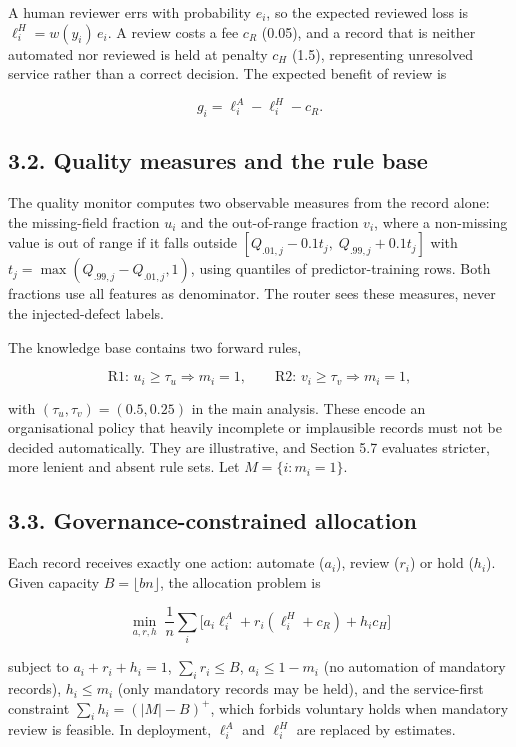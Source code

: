 \documentclass[
  11pt,
]{article}
\begin{document}
A human reviewer errs with probability \(e_i\), so the expected reviewed
loss is \(\ell^H_i = w(y_i)\,e_i\). A review costs a fee \(c_R\) (0.05),
and a record that is neither automated nor reviewed is held at penalty
\(c_H\) (1.5), representing unresolved service rather than a correct
decision. The expected benefit of review is

\[g_i = \ell^A_i - \ell^H_i - c_R. \tag{2}\]

\hypertarget{quality-measures-and-the-rule-base}{%
\subsection{3.2. Quality measures and the rule
base}\label{quality-measures-and-the-rule-base}}

The quality monitor computes two observable measures from the record
alone: the missing-field fraction \(u_i\) and the out-of-range fraction
\(v_i\), where a non-missing value is out of range if it falls outside
\([Q_{.01,j}-0.1t_j,\;Q_{.99,j}+0.1t_j]\) with
\(t_j=\max(Q_{.99,j}-Q_{.01,j},1)\), using quantiles of
predictor-training rows. Both fractions use all features as denominator.
The router sees these measures, never the injected-defect labels.

The knowledge base contains two forward rules,

\[\text{R1: } u_i \ge \tau_u \Rightarrow m_i = 1, \qquad \text{R2: } v_i \ge \tau_v \Rightarrow m_i = 1, \tag{3}\]

with \((\tau_u,\tau_v)=(0.5,0.25)\) in the main analysis. These encode
an organisational policy that heavily incomplete or implausible records
must not be decided automatically. They are illustrative, and Section
5.7 evaluates stricter, more lenient and absent rule sets. Let
\(M=\{i: m_i=1\}\).

\hypertarget{governance-constrained-allocation}{%
\subsection{3.3. Governance-constrained
allocation}\label{governance-constrained-allocation}}

Each record receives exactly one action: automate (\(a_i\)), review
(\(r_i\)) or hold (\(h_i\)). Given capacity \(B=\lfloor bn \rfloor\),
the allocation problem is

\[\min_{a,r,h}\; \frac1n\sum_i \big[a_i\ell^A_i + r_i(\ell^H_i + c_R) + h_i c_H\big] \tag{4}\]

subject to \(a_i+r_i+h_i=1\), \(\sum_i r_i \le B\), \(a_i \le 1-m_i\)
(no automation of mandatory records), \(h_i \le m_i\) (only mandatory
records may be held), and the service-first constraint
\(\sum_i h_i = (|M|-B)^+\), which forbids voluntary holds when mandatory
review is feasible. In deployment, \(\ell^A_i\) and \(\ell^H_i\) are
replaced by estimates.
\end{document}

